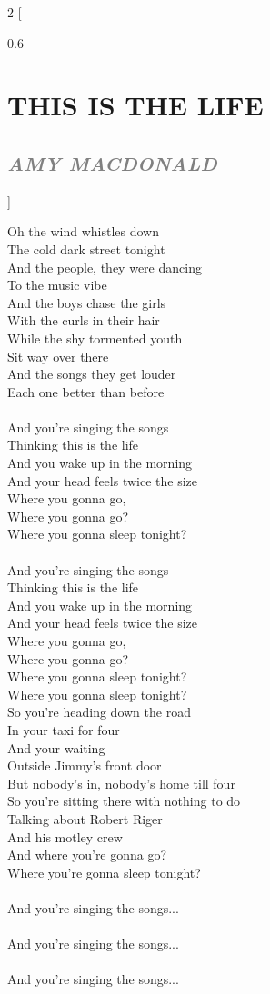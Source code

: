 \documentclass[100pt,a4paper]{report}
\newenvironment{song2}[2]
	{	
    	\begin{multicols*}{2}
		[
			\begin{spacing}{0.6}
				\section*{\LARGE\centering \MakeUppercase{\textbf{{#1}}}}
				\subsection*{\Large\centering \textit{\textcolor{gray}{\MakeUppercase{{#2}}}}}
			\end{spacing}
		]
		\Large
	}
	{
	\end{multicols*}
	\newpage
    }
\begin{document}
\begin{song2}{This Is The Life}{Amy MacDonald}
\noindent
Oh the wind whistles down\\
The cold dark street tonight\\
And the people, they were dancing\\ 
To the music vibe\\
And the boys chase the girls\\ 
With the curls in their hair\\
While the shy tormented youth\\ 
Sit way over there\\
And the songs they get louder\\
Each one better than before\\
\\
And you're singing the songs\\
Thinking this is the life\\
And you wake up in the morning\\
And your head feels twice the size\\
Where you gonna go,\\
Where you gonna go?\\
Where you gonna sleep tonight?\\
\\
And you're singing the songs\\
Thinking this is the life\\
And you wake up in the morning\\
And your head feels twice the size\\
Where you gonna go,\\
Where you gonna go?\\
Where you gonna sleep tonight?\\
Where you gonna sleep tonight?\\
\vfill
\columnbreak
\noindent
So you're heading down the road\\ 
In your taxi for four\\
And your waiting\\ 
Outside Jimmy's front door\\
But nobody's in, nobody's home till four\\
So you're sitting there with nothing to do\\
Talking about Robert Riger\\ 
And his motley crew\\
And where you're gonna go?\\
Where you're gonna sleep tonight?\\
\\
And you're singing the songs...\\
\\
And you're singing the songs...\\
\\
And you're singing the songs...\\
\end{song2}
\end{document}
